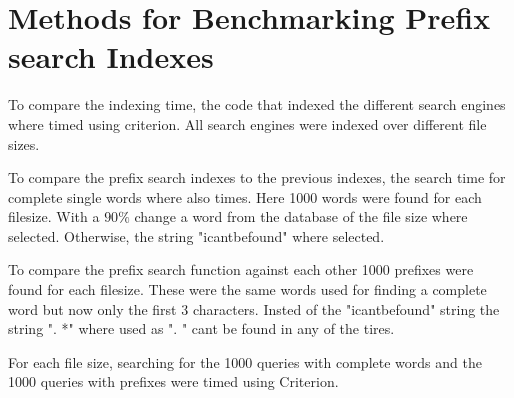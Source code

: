 \section{Methods for Benchmarking Prefix search Indexes}
To compare the indexing time, the code that indexed the different search engines where timed using criterion. All search engines were indexed over different file sizes.

To compare the prefix search indexes to the previous indexes, the search time for complete single words where also times. Here 1000 words were found for each filesize. With a $90\%$ change a word from the database of the file size where selected. Otherwise, the string "icantbefound" where selected.

To compare the prefix search function against each other 1000 prefixes were found for each filesize. These were the same words used for finding a complete word but now only the first 3 characters. Insted of the "icantbefound" string the string ". *" where used as ". " cant be found in any of the tires.

For each file size, searching for the 1000 queries with complete words and the 1000 queries with prefixes were timed using Criterion.


